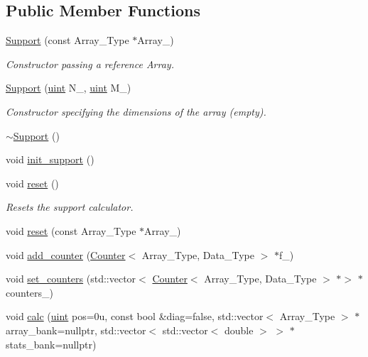 \subsection*{Public Member Functions}
\begin{DoxyCompactItemize}
\item 
\hyperlink{classbarry_1_1_support_ab946f83af83c571de8bd5a17ce453240}{Support} (const Array\+\_\+\+Type $\ast$Array\+\_\+)
\begin{DoxyCompactList}\small\item\em Constructor passing a reference Array. \end{DoxyCompactList}\item 
\hyperlink{classbarry_1_1_support_aa451bd21c09935b686869fef96c5b874}{Support} (\hyperlink{namespacebarry_a11dfc53ddb4672278319aa04f1e09a6c}{uint} N\+\_\+, \hyperlink{namespacebarry_a11dfc53ddb4672278319aa04f1e09a6c}{uint} M\+\_\+)
\begin{DoxyCompactList}\small\item\em Constructor specifying the dimensions of the array (empty). \end{DoxyCompactList}\item 
\hyperlink{classbarry_1_1_support_a1ffd5ee63fa68338cbbf443e1e54e5b4}{$\sim$\+Support} ()
\item 
void \hyperlink{classbarry_1_1_support_aef6fda6e7a0989f53fcd252609d770c9}{init\+\_\+support} ()
\item 
void \hyperlink{classbarry_1_1_support_a5878ac60282fc1380c92f3ba502f249e}{reset} ()
\begin{DoxyCompactList}\small\item\em Resets the support calculator. \end{DoxyCompactList}\item 
void \hyperlink{classbarry_1_1_support_afbe207cc2762bc698c9ccb3212e9de78}{reset} (const Array\+\_\+\+Type $\ast$Array\+\_\+)
\item 
void \hyperlink{classbarry_1_1_support_a0ad8bb6202451253697d771a28859210}{add\+\_\+counter} (\hyperlink{classbarry_1_1_counter}{Counter}$<$ Array\+\_\+\+Type, Data\+\_\+\+Type $>$ $\ast$f\+\_\+)
\item 
void \hyperlink{classbarry_1_1_support_a07f225ee54158980ededaccc47abad4c}{set\+\_\+counters} (std\+::vector$<$ \hyperlink{classbarry_1_1_counter}{Counter}$<$ Array\+\_\+\+Type, Data\+\_\+\+Type $>$ $\ast$$>$ $\ast$counters\+\_\+)
\item 
void \hyperlink{classbarry_1_1_support_ab5261952be0746f188ee024e3e8c26c1}{calc} (\hyperlink{namespacebarry_a11dfc53ddb4672278319aa04f1e09a6c}{uint} pos=0u, const bool \&diag=false, std\+::vector$<$ Array\+\_\+\+Type $>$ $\ast$array\+\_\+bank=nullptr, std\+::vector$<$ std\+::vector$<$ double $>$ $>$ $\ast$stats\+\_\+bank=nullptr)
$$
\end{DoxyCompactItemize}
